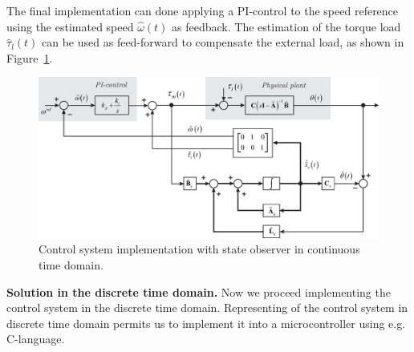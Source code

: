 \documentclass[11pt,a4paper,oneside]{book}
\numberwithin{equation}{section}
\theoremstyle{it}
\theoremstyle{definition}
\begin{document}
	The final implementation can done applying a PI-control to the speed reference using the estimated speed $\hat{\omega}(t)$ as feedback. The estimation of the torque load $\hat{\tau}_l(t)$ can be used as feed-forward to compensate the external load, as shown in Figure~\ref{ctrl_ct}.
	\begin{figure}[H]
		\centering
		\includegraphics[width = 425pt, 
		keepaspectratio]{figures/dynamical_plant_ctrl_v.eps}
		\captionsetup{width=0.5\textwidth, font=small}		
		\caption{Control system implementation with state observer in continuous time domain.}
		\label{ctrl_ct}
	\end{figure}
	
	\vspace{10mm}
	\textbf{Solution in the discrete time domain.}
	Now we proceed implementing the control system in the discrete time domain. Representing of the control system in discrete time domain permits us to implement it into a microcontroller using e.g. C-language.  
	
\end{document}
